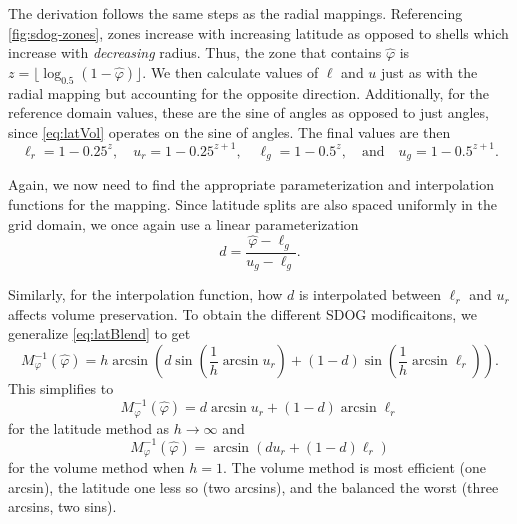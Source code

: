 The derivation follows the same steps as the radial mappings.
Referencing \cref{fig:sdog-zones}, zones increase with increasing latitude as opposed to shells which increase with \textit{decreasing} radius.
Thus, the zone that contains $\hat{\varphi}$ is $z = \lfloor \log_{0.5} ( 1 - \hat{\varphi} ) \rfloor$.
We then calculate values of $\ell$ and $u$ just as with the radial mapping but accounting for the opposite direction.
Additionally, for the reference domain values, these are the sine of angles as opposed to just angles, since \cref{eq:latVol} operates on the sine of angles.
The final values are then
%
\begin{equation*}
\ell_r = 1 - 0.25^{z}, \quad u_r = 1 - 0.25^{z + 1}, \quad \ell_g = 1 - 0.5^z, \quad \text{and} \quad u_g = 1 - 0.5^{z + 1}.
\end{equation*}
%

Again, we now need to find the appropriate parameterization and interpolation functions for the mapping.
Since latitude splits are also spaced uniformly in the grid domain, we once again use a linear parameterization
%
\begin{equation} \label{eq:latInvD}
d = \frac{ \hat{\varphi} - \ell_g }{ u_g - \ell_g }.
\end{equation}

Similarly, for the interpolation function, how $d$ is interpolated between $\ell_r$ and $u_r$ affects volume preservation.
To obtain the different SDOG modificaitons, we generalize \cref{eq:latBlend} to get
%
\begin{equation} \label{eq:latInv}
M_\varphi^{-1}(\hat{\varphi}) = h \arcsin \left( d \sin \left( \frac{1}{h} \arcsin u_r \right) + \left( 1 - d \right) \sin \left( \frac{1}{h} \arcsin \ell_r \right) \right).
\end{equation}
%
This simplifies to
%
\begin{equation*}
M_\varphi^{-1}(\hat{\varphi}) = d \arcsin u_r  + \left( 1 - d \right) \arcsin \ell_r
\end{equation*}
%
for the latitude method as $h \rightarrow \infty$ and
%
\begin{equation*}
M_\varphi^{-1}(\hat{\varphi}) = \arcsin \left( d u_r + \left( 1 - d \right) \ell_r \right)
\end{equation*}
%
for the volume method when $h = 1$.
The volume method is most efficient (one arcsin), the latitude one less so (two arcsins), and the balanced the worst (three arcsins, two sins).


